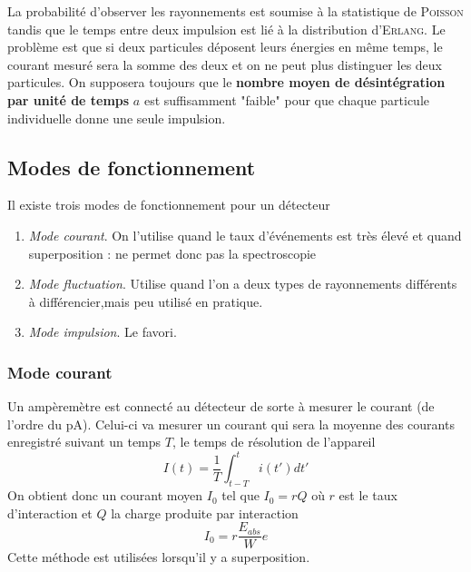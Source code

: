 La probabilité d'observer les rayonnements est soumise à la 
statistique de \textsc{Poisson} tandis que le temps entre deux 
impulsion est lié à la distribution d'\textsc{Erlang}. Le problème
est que si deux particules déposent leurs énergies en même temps, 
le courant mesuré sera la somme des deux et on ne peut plus 
distinguer les deux particules. On supposera toujours que le 
\textbf{nombre moyen de désintégration par unité de temps } $a$ est
suffisamment "faible" pour que chaque particule individuelle donne
une seule impulsion.


\subsection{Modes de fonctionnement}%
Il existe trois modes de fonctionnement pour un détecteur
\begin{enumerate}
\item \textit{Mode courant}. On l'utilise quand le taux 
d'événements est très élevé et quand superposition : ne permet donc
pas la spectroscopie
\item \textit{Mode fluctuation}. Utilise quand l'on a deux types 
de rayonnements différents à différencier,mais peu utilisé en 
pratique. 
\item \textit{Mode impulsion}. Le favori.
\end{enumerate}

	\subsubsection{Mode courant}%
	Un ampèremètre est connecté au détecteur de sorte à mesurer le
	courant (de l'ordre du pA). Celui-ci va mesurer un courant qui
	sera la moyenne des courants enregistré suivant un temps $T$, 
	le temps de résolution de l'appareil
	\begin{equation}
	I(t)=\frac{1}{T}\int_{t-T}^t i(t')dt'
	\end{equation}
	On obtient donc un courant moyen $I_0$ tel que $I_0=rQ$ où 
	$r$ est le taux d'interaction et $Q$ la charge produite par 
	interaction
	\begin{equation}
	I_0=r\frac{E_{abs}}{W}e
	\end{equation}
	Cette méthode est utilisées lorsqu'il y a superposition.
	
